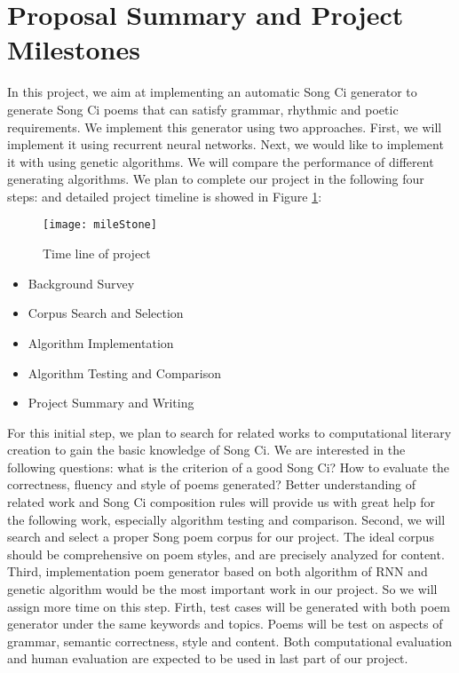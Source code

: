 \section{Proposal Summary and Project Milestones}
In this project, we aim at implementing an automatic Song Ci generator to generate Song Ci poems that can satisfy grammar, rhythmic and poetic requirements.
%
We implement this generator using two approaches. First, we will implement it using recurrent neural networks.
%
Next, we would like to implement it with using genetic algorithms.
%
We will compare the performance of different generating algorithms.
%
We plan to complete our project in the following four steps:
and detailed project timeline is showed in Figure \ref{fig:projecttimeline}:
\begin{figure}[htbp]
	\centering
	\texttt{[image: mileStone]}
	\caption{Time line of project}
	\label{fig:projecttimeline}	
\end{figure}
\begin{itemize}
\item Background Survey
\item Corpus Search and Selection
\item Algorithm Implementation
\item Algorithm Testing and Comparison
\item Project Summary and Writing
\end{itemize}

For this initial step, we plan to search for related works to computational literary creation to gain the basic knowledge of Song Ci.
%
We are interested in the following questions: what is the criterion of a good Song Ci? How to evaluate the correctness, fluency and style of poems generated?
%
Better understanding of related work and Song Ci composition rules will provide us with great help for the following work, especially algorithm testing and comparison. 
%
Second, we will search and select a proper Song poem corpus for our project. The ideal corpus should be comprehensive on poem styles, and are precisely analyzed for content. 
%
Third, implementation poem generator based on both algorithm of RNN and genetic algorithm would be the most important work in our project. So we will assign more time on this step. 
%
Firth, test cases will be generated with both poem generator under the same keywords and topics. Poems will be test on aspects of grammar, semantic correctness, style and content. Both computational evaluation and human evaluation are expected to be used in last part of our project.


